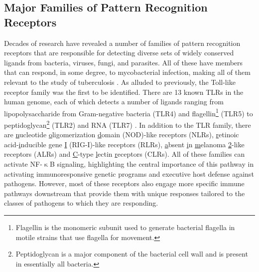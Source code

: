 \subsection{Major Families of Pattern Recognition Receptors}\label{prrs}

Decades of research have revealed a number of families of pattern recognition receptors that are responsible for detecting diverse sets of widely conserved ligands from bacteria, viruses, fungi, and parasites. All of these have members that can respond, in some degree, to mycobacterial infection, making all of them relevant to the study of tuberculosis \citep{Ishikawa2017}. As alluded to previously, the Toll\hyp{}like receptor family was the first to be identified. There are 13 known TLRs in the human genome, each of which detects a number of ligands ranging from lipopolysaccharide from Gram\hyp{}negative bacteria (TLR4) and flagellin\footnote{Flagellin is the monomeric subunit used to generate bacterial flagella in motile strains that use flagella for movement.} (TLR5) to peptidoglycan\footnote{Peptidoglycan is a major component of the bacterial cell wall and is present in essentially all bacteria.} (TLR2) and RNA (TLR7) \citep{Kawai2007}. In addition to the TLR family, there are \underline{n}ucleotide \underline{o}ligomerization \underline{d}omain (NOD)\hyp{}like receptors (NLRs), \underline{r}etinoic acid\hyp{}\underline{i}nducible \underline{g}ene \underline{I} (RIG\hyp{}I)\hyp{}like receptors (RLRs), \underline{a}bsent \underline{i}n \underline{m}elanoma \underline{2}\hyp{}like receptors (ALRs) and \underline{C}\hyp{}type \underline{l}ectin \underline{r}eceptors (CLRs). All of these families can activate NF\hyp{}$\upkappa$B signaling, highlighting the central importance of this pathway in activating immunoresponsive genetic programs and executive host defense against pathogens. However, most of these receptors also engage more specific immune pathways downstream that provide them with unique responses tailored to the classes of pathogens to which they are responding.

